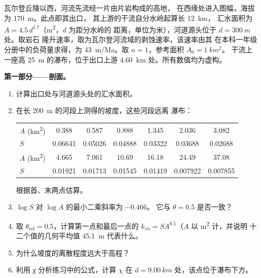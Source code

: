 \begin{problem}
\label{pb:b3:quantitative-geomorphology:1}
瓦尔登丘陵以西，河流先流经一片由片岩构成的高地，
在西缘处进入图幅，海拔为 \qty{170}{m}。此点即其出口，
其上游的干流自分水岭起算长 \qty{12}{km}，
汇水面积为 $A = 4.5\,d^{1.7}$（\unit{m^2}，$d$ 为距分水岭的
距离，单位为米），河道源头位于 $d = \qty{300}{m}$ 处。取岩石
隆升速率，取为瓦尔登河流域的剥蚀速率，该速率由其
在本科一年级分册中的负荷量求得，为 \qty{43}{m/Ma}。取 $n = 1$，参考面积 $A_0 = \qty{1}{km^2}$。
干流上一座高 \qty{25}{m} 的瀑布，位于出口上游
\qty{4.60}{km} 处。所有数值均为虚构。

\medskip\noindent\textbf{第一部分——剖面。}
\begin{enumerate}
\item 计算出口处与河道源头处的汇水面积。
\item 在长 \qty{200}{m} 的河段上测得的坡度，这些河段远离
  瀑布：

  \smallskip
  {\small\begin{tabular}{l*{6}{c}}
  $A$ (\unit{km^2}) & 0.388 & 0.587 & 0.888 & 1.345 & 2.036 & 3.082 \\
  $S$ & 0.06641 & 0.05026 & 0.04888 & 0.03322 & 0.03688 & 0.02688 \\[2pt]
  $A$ (\unit{km^2}) & 4.665 & 7.061 & 10.69 & 16.18 & 24.49 & 37.08 \\
  $S$ & 0.01921 & 0.01713 & 0.01545 & 0.01419 & 0.007922 & 0.007855
  \end{tabular}}

  \smallskip
  根据首、末两点估算。
\item $\log S$ 对 $\log A$ 的最小二乘斜率为 $-0.466$。
  它与 $\theta = 0.5$ 是否一致？
\item 取 $\theta_{\mathrm{ref}} = 0.5$，计算第一点和最后一点的 $k_{sn} = S A^{0.5}$（$A$ 以
  \unit{m^2} 计，并说明
  十二个值的几何平均值 \qty{45.1}{m} 代表什么。
\item 为什么坡度的离散程度远大于高程？
\item 利用 χ 分析练习中的公式，计算 $\chi$ 在 $d =
  \qty{9.00}{km}$ 处，该点位于瀑布下方。
\end{enumerate}


\end{problem}
